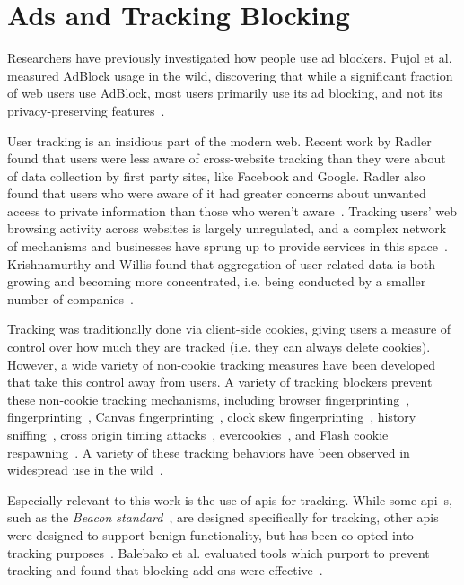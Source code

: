 \section{Ads and Tracking Blocking}
\label{background:ads-tracking-blocking}

Researchers have previously investigated how people use ad blockers.
Pujol et al. measured AdBlock usage in the wild, discovering that while a
significant fraction of web users use AdBlock, most users
primarily use its ad blocking, and not its privacy-preserving
features~\cite{pujolannoyed}.

User tracking is an insidious part of the modern web. Recent work by Radler
found that users were less aware of cross-website tracking than they were about
of data collection by first party sites, like Facebook and Google. Radler also
found that users who were aware of it had greater concerns about unwanted
access to private information than those who weren't
aware~\cite{rader2014awareness}.  Tracking users' web browsing activity across
websites is largely unregulated, and a complex network of mechanisms and
businesses have sprung up to provide services in this
space~\cite{falahrastegar2014anatomy}.  Krishnamurthy and Willis found that
aggregation of user-related data is both growing and becoming more
concentrated, i.e. being conducted by a smaller number of
companies~\cite{krishnamurthy2009privacy}.

Tracking was traditionally done via client-side cookies, giving users a measure
of control over how much they are tracked (i.e. they can always delete
cookies).  However, a wide variety of non-cookie tracking measures have been
developed that take this control away from users. A variety of tracking
blockers prevent these non-cookie tracking mechanisms, including browser
fingerprinting~\cite{eckersley2010unique}, \JS
fingerprinting~\cite{mowery2011fingerprinting,mulazzani2013fast}, Canvas
fingerprinting~\cite{mowery2012pixel}, clock skew
fingerprinting~\cite{kohno2005remote}, history
sniffing~\cite{jang2010empirical}, cross origin timing
attacks~\cite{van2015clock}, evercookies~\cite{evercookies}, and Flash cookie
respawning~\cite{soltani2010flash,ayenson2011flash}.  A variety of these
tracking behaviors have been observed in widespread use in the
wild~\cite{soltani2010flash,ayenson2011flash,acar2014web,nikiforakis2013cookieless,mcdonald2011survey,olejnik2014selling,sorensen2013zombie}.

Especially relevant to this work is the use of \JS \gls{api}s for tracking.
While some \gls{api}~s, such as the \textit{Beacon standard}~\cite{beaconapi},
are designed specifically for tracking, other \gls{api}s were designed to support
benign functionality, but has been co-opted into tracking
purposes~\cite{mowery2012pixel,fingerprintjs2}.  Balebako et al. evaluated
tools which purport to prevent tracking and found that blocking add-ons were
effective~\cite{balebako2012measuring}.
